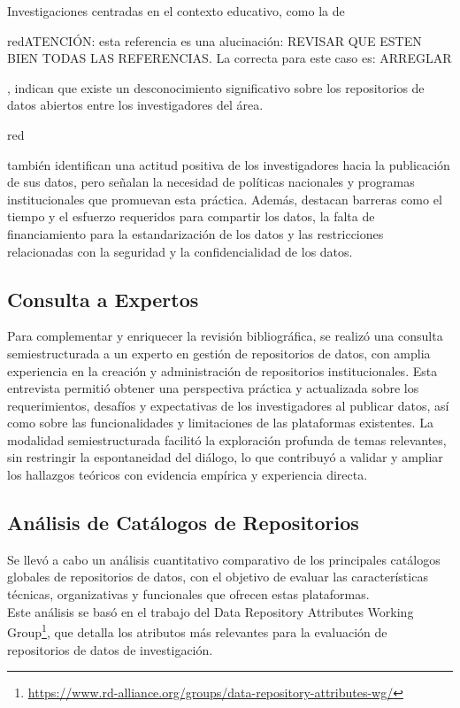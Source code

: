 \documentclass[runningheads]{llncs}
\def \bchregi {\begin{color}{red}}
\def \echregi {\end{color}}
\begin{document}
Investigaciones centradas en el contexto educativo, como la de \bchregi ATENCIÓN: esta referencia es una alucinación: \cite{casali2022} REVISAR QUE ESTEN BIEN TODAS LAS REFERENCIAS. La correcta para este caso es: \cite{casali2022open}  ARREGLAR \echregi, indican que existe un desconocimiento significativo sobre los repositorios de datos abiertos entre los investigadores del área. \bchregi \cite{casali2022} \echregi también identifican una actitud positiva de los investigadores hacia la publicación de sus datos, pero señalan la necesidad de políticas nacionales y programas institucionales que promuevan esta práctica. Además, destacan barreras como el tiempo y el esfuerzo requeridos para compartir los datos, la falta de financiamiento para la estandarización de los datos y las restricciones relacionadas con la seguridad y la confidencialidad de los datos.\\

\subsection{Consulta a Expertos}

Para complementar y enriquecer la revisión bibliográfica, se realizó una consulta semiestructurada a un experto en gestión de repositorios de datos, con amplia experiencia en la creación y administración de repositorios institucionales. Esta entrevista permitió obtener una perspectiva práctica y actualizada sobre los requerimientos, desafíos y expectativas de los investigadores al publicar datos, así como sobre las funcionalidades y limitaciones de las plataformas existentes.
La modalidad semiestructurada facilitó la exploración profunda de temas relevantes, sin restringir la espontaneidad del diálogo, lo que contribuyó a validar y ampliar los hallazgos teóricos con evidencia empírica y experiencia directa.

\subsection{Análisis de Catálogos de Repositorios}

Se llevó a cabo un análisis cuantitativo comparativo de los principales catálogos globales de repositorios de datos, con el objetivo de evaluar las características técnicas, organizativas y funcionales que ofrecen estas plataformas.\\

Este análisis se basó en el trabajo del Data Repository Attributes Working Group\footnote{\url{https://www.rd-alliance.org/groups/data-repository-attributes-wg/}}, que detalla los atributos más relevantes para la evaluación de repositorios de datos de investigación.\\
\end{document}
